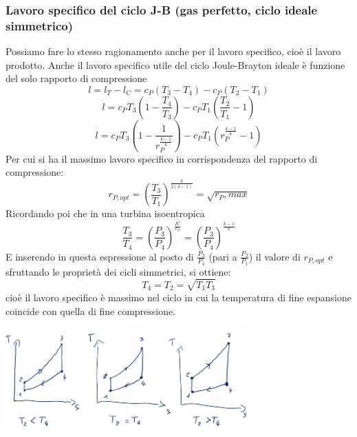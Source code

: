 \subsubsection{Lavoro specifico del ciclo J-B (gas perfetto, ciclo ideale simmetrico)}
Possiamo fare lo stesso ragionamento anche per il lavoro specifico, cioè il lavoro prodotto.\newline
Anche il lavoro specifico utile del ciclo Joule-Brayton ideale è funzione del solo rapporto di compressione
\[
    l = l_T-l_C = c_P (T_3-T_4) - c_P(T_2-T_1)
\]
\[
    l = c_P T_3 \left(1- \frac{T_4}{T_3}\right) - c_P T_1 \left(\frac{T_2}{T_1} - 1\right)
\]
\[
    l = c_P T_3 \left(1- \frac{1}{r_P^{\frac{k-1}{k}}}\right) - c_P T_1 \left(r_P^{\frac{k-1}{k}}-1\right)
\]
Per cui si ha il massimo lavoro specifico in corrispondenza del rapporto di compressione:
\[
    r_{P,opt} = \left(\frac{T_3}{T_1}\right)^{\frac{k}{2(k-1)}} = \sqrt{r_P,max}
\]
Ricordando poi che in una turbina isoentropica
\[
    \frac{T_3}{T_4} = \left(\frac{P_3}{P_4}\right)^{\frac{R^*}{c_P}} = \left(\frac{P_3}{P_4}\right)^\frac{k-1}{k}
\]
E inserendo in questa espressione al posto di $\frac{P_3}{P_4}$ (pari a $\frac{P_2}{P_1}$) il valore di $r_{P,opt}$ e sfruttando le proprietà dei cicli simmetrici, si ottiene:
\[
    T_4 = T_2 = \sqrt{T_1 T_3}
\]
cioè il lavoro specifico è massimo nel ciclo in cui la temperatura di fine espansione coincide con quella di fine compressione.
\begin{center}
    \includegraphics[height=4cm]{../L07/img7.PNG}
\end{center}
